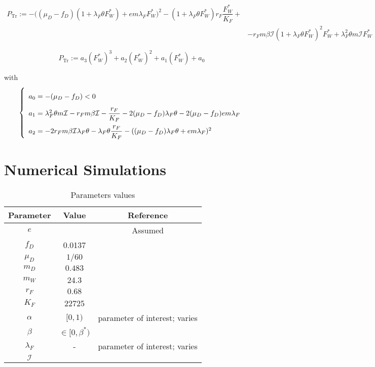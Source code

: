 \documentclass{article}
\newcommand{\lfw}{\lambda_{F}}
\newcommand{\lfw}{\lambda_{F}}
\newcommand{\cI}{\mathcal{I}}
\DeclareMathOperator{\Tr}{Tr}
\begin{document}
\newpage


\begin{align*}
P_{\Tr} := -\Big((\mu_D -f_D)(1 + \lfw \theta F_W^*) +e m \lfw F_W^* \Big)^2 - (1 + \lfw \theta F_W^*) r_F  \dfrac{F_W^*}{K_F} + \\& -r_F m \beta \cI (1 + \lfw \theta F_W^*)^2 F_W^* + \lfw^2 \theta m \cI F_W^*  
\end{align*}

\begin{equation*}
P_{\Tr} := a_3 (F_W^*)^3 +a_2 (F_W^*)^2+a_1 (F_W^*)+a_0
\end{equation*}

with
\begin{equation}
\def\arraystretch{2}
\left\lbrace \begin{array}{l}
a_0 = -(\mu_D - f_D) < 0 \\
a_1 = \lfw^2 \theta m \cI - r_F m \beta \cI - \dfrac{r_F}{K_F} - 2(\mu_D - f_D) \lfw \theta - 2 (\mu_D - f_D) em \lfw \\
a_2 = -2r_F m \beta	\cI \lfw \theta - \lfw \theta \dfrac{r_F}{K_F} - ((\mu_D - f_D) \lfw \theta +em \lfw)^2
\end{array} \right.
\end{equation}
\newpage

\section{Numerical Simulations}

\begin{table}[ht]
\centering
\begin{tabular}{|c|c|c|}
\hline 
Parameter & Value & Reference \\ 
\hline 
$e$ & & Assumed\\
$f_D$ & 0.0137 & \cite{koppert_consommation_1996}\\
$\mu_D$ & $1/60$ & \cite{ins_demographie}\\
$m_D$ & $0.483$ & \cite{avila_interpreting_2019}\\
$m_W$ & 24.3 & \cite{avila_interpreting_2019}\\
$r_F$ & $0.68$ & \cite{robinson_intrinsic_1986}\\
$K_F$ & 22725 & \cite{janson_ecological_1990} \\
$\alpha$ & $[0, 1)$ & parameter of interest; varies \\
$\beta$ & $\in [0, \beta^*)$ &  \\
$\lfw$ & - & parameter of interest; varies \\
$\mathcal{I}$ &  & \\
\hline
\end{tabular}

\caption{Parameters values}
\end{table}
\end{document}
